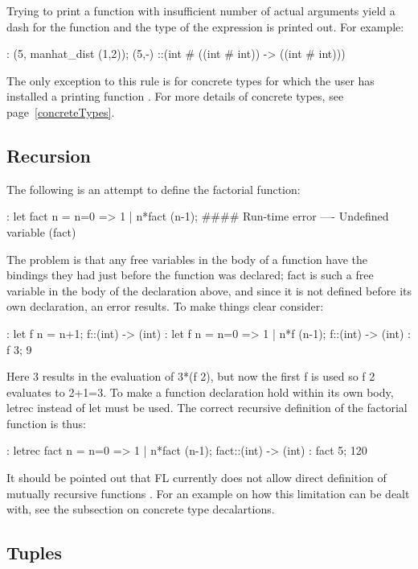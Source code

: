 Trying to print%
%
{} a function with insufficient number of actual arguments
yield a dash for the function and the type of the expression is printed out.
For example:
\begin{hol}
: (5, manhat\_dist (1,2));
(5,-) ::(int # ((int # int)) -> ((int # int)))
\end{hol}
The only exception to this rule is for concrete types
for which the user has installed a printing function%
%
{}.
For more details of concrete types, see page~\ref{concreteTypes}.

\subsection{Recursion}

The following is an attempt to define the factorial function:
\begin{hol}
: let fact n = n=0 => 1 | n*fact (n-1);
#### Run-time error
---- Undefined variable (fact)
\end{hol}
The problem is that any free variables in the body of a function have
the bindings they had
just before the function was declared; fact is such a free variable
in the body of the declaration
above, and since it is not defined before its own declaration, an error
results. To make things
clear consider:
\begin{hol}
: let f n = n+1;
f::(int) -> (int)
: let f n = n=0 => 1 | n*f (n-1);
f::(int) -> (int)
: f 3;
9
\end{hol}
Here 3 results in the evaluation of 3*(f 2), but now the first f is
used so f 2 evaluates to 2+1=3.
To make a function declaration hold within its own body, letrec%
%
{}
instead of let must be used.
The correct recursive%
%
{} definition of the factorial function is thus:
\begin{hol}
: letrec fact n = n=0 => 1 | n*fact (n-1);
fact::(int) -> (int)
: fact 5;
120
\end{hol}

It should be pointed out that FL currently does not allow direct definition
of mutually recursive functions%
%
{}.
For an example on how this limitation can be dealt with, see
the subsection on concrete type decalartions.

\subsection{Tuples}

